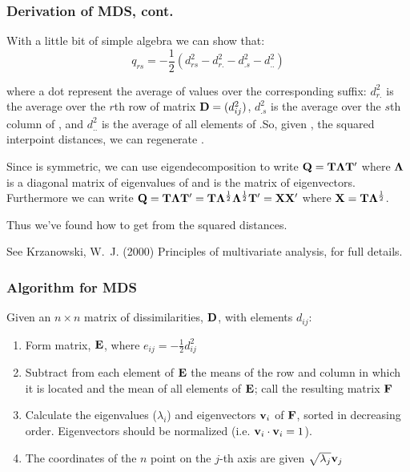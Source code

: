 \documentclass{beamer}
\begin{document}
\begin{frame}[shrink=5]
\frametitle{Derivation of MDS, cont.}

With a little bit of simple algebra we can show that:
\[
q_{rs} = -\frac{1}{2}(d_{rs}^2- d_{r.}^2 - d_{.s}^2 - d_{..}^2)
\]

where a dot represent the average of values over the corresponding suffix: $d_{r.}^2$ is the average over the $r$th row of matrix $\mathbf{D}=(d_{ij}^2)$, $d_{.s}^2$ is the average over the $s$th column of , and $d_{..}^2$ is the average of all elements of .So, given , the squared interpoint distances, we can regenerate .

Since  is symmetric, we can use eigendecomposition to write $\mathbf{Q}=\mathbf{T}\mathbf{\Lambda}\mathbf{T}'$  where $\mathbf{\Lambda}$ is a diagonal matrix of eigenvalues of  and  is the matrix of eigenvectors. Furthermore we can write $\mathbf{Q}=\mathbf{T}\mathbf{\Lambda}\mathbf{T}'=\mathbf{T}\mathbf{\Lambda}^{\frac{1}{2}}\mathbf{\Lambda}^{\frac{1}{2}}\mathbf{T}'= \mathbf{X}\mathbf{X}'$ where $\mathbf{X}=\mathbf{T}\mathbf{\Lambda}^{\frac{1}{2}}$.

\alert{Thus we've found how to get  from the squared distances.}

{\footnotesize See Krzanowski, W.\ J. (2000) Principles of multivariate analysis, for full details.}
\end{frame}

\begin{frame}
\frametitle{Algorithm for MDS}

Given an $n \times n$ matrix of dissimilarities, $\mathbf{D}$, with elements $d_{ij}$:

\begin{enumerate}
\item Form matrix, $\mathbf{E}$, where $e_{ij} = -\frac{1}{2} d_{ij}^2$

\item Subtract from each element of $\mathbf{E}$ the means of the row and column in which it is located and the mean of all elements of $\mathbf{E}$; call the resulting matrix $\mathbf{F}$

\item Calculate the eigenvalues ($\lambda_i$) and eigenvectors $\mathbf{v}_i$ of $\mathbf{F}$, sorted in decreasing order. Eigenvectors should be normalized (i.e. $\mathbf{v}_i \cdot \mathbf{v}_i = 1$).

\item The coordinates of the $n$ point on the $j$-th axis are given $\sqrt{\lambda_j}\mathbf{v}_j$

\end{enumerate}

\end{frame}
\end{document}
